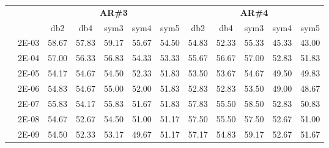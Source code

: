 \begin{table}[H]
\begin{tabular}{|c|c|c c c c c|c c c c c|}
\cline{3-12}
\multicolumn{2}{c}{} & \multicolumn{5}{|c|}{\textbf{AR\#3}}  & \multicolumn{5}{c|}{\textbf{AR\#4}} \\\cline{3-12}
\multicolumn{2}{c}{}  & \multicolumn{1}{|c}{db2} & db4 & sym3 & sym4 & sym5 & db2 & db4& sym3 & sym4 & sym5 \\\hline
\multicolumn{1}{|c|}{ \multirow{6}{*}{\rotatebox[origin=c]{90}{\textbf{Gamma}}} }
&2E-03&	58.67&	57.83&	59.17&	55.67&	54.50&	54.83&	52.33&	55.33&	45.33&	43.00	\\\cline{2-12}
&2E-04&	57.00&	56.33&	56.83&	54.33&	53.33&	55.67&	56.67&	57.00&	52.83&	51.83	\\\cline{2-12}
&2E-05&	54.17&	54.67&	54.50&	52.33&	51.83&	53.50&	53.67&	54.67&	49.50&	49.83	\\\cline{2-12}
&2E-06&	54.83&	54.67&	55.00&	52.00&	51.83&	52.83&	52.83&	53.50&	49.00&	48.67	\\\cline{2-12}
&2E-07&	55.83&	54.17&	55.83&	51.67&	51.83&	57.83&	55.50&	58.50&	52.83&	50.83	\\\cline{2-12}
&2E-08&	54.67&	52.67&	54.50&	51.00&	51.17&	57.50&	55.50&	57.50&	52.67&	51.00	\\\cline{2-12}
&2E-09&	54.50&	52.33&	53.17&	49.67&	51.17&	57.17&	54.83&	59.17&	52.67&	51.67	

	
	
\\\midrule
\end{tabular}

\end{table}


